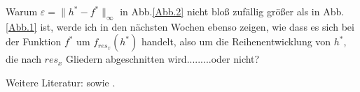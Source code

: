 \documentclass[a4paper]{article}
\begin{document}
Warum $\varepsilon=\lVert h^*-f^*\rVert_{\infty}$ in Abb.\ref{Abb.2} nicht bloß zufällig größer als in Abb.\ref{Abb.1} ist, werde ich in den nächsten Wochen ebenso zeigen, wie dass es sich bei der Funktion $f^*$ um $f_{res_x}(h^*)$ handelt, also um die Reihenentwicklung von $h^*$, die nach $res_x$ Gliedern abgeschnitten wird.........oder nicht?

Weitere Literatur: \cite[]{Achilles1978} sowie \cite[]{Schroeder1978}.



\end{document}
